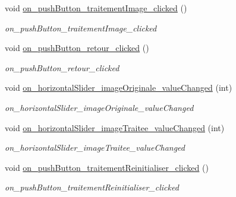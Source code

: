 \begin{DoxyCompactItemize}
\mbox{\label{classAppMainWindow_a094e49f72edd2a6b229f14aaff268baa}} 
void \hyperlink{classAppMainWindow_a094e49f72edd2a6b229f14aaff268baa}{on\+\_\+push\+Button\+\_\+traitement\+Image\+\_\+clicked} ()
\begin{DoxyCompactList}\small\item\em on\+\_\+push\+Button\+\_\+traitement\+Image\+\_\+clicked \end{DoxyCompactList}\item 
\mbox{\label{classAppMainWindow_ad88e547ca3b09758ee7695b936bcf8e9}} 
void \hyperlink{classAppMainWindow_ad88e547ca3b09758ee7695b936bcf8e9}{on\+\_\+push\+Button\+\_\+retour\+\_\+clicked} ()
\begin{DoxyCompactList}\small\item\em on\+\_\+push\+Button\+\_\+retour\+\_\+clicked \end{DoxyCompactList}\item 
\mbox{\label{classAppMainWindow_ab89de41267707db6ce2e05d81426ca52}} 
void \hyperlink{classAppMainWindow_ab89de41267707db6ce2e05d81426ca52}{on\+\_\+horizontal\+Slider\+\_\+image\+Originale\+\_\+value\+Changed} (int)
\begin{DoxyCompactList}\small\item\em on\+\_\+horizontal\+Slider\+\_\+image\+Originale\+\_\+value\+Changed \end{DoxyCompactList}\item 
\mbox{\label{classAppMainWindow_a93072ed048c9f2787297287aeabcbc5c}} 
void \hyperlink{classAppMainWindow_a93072ed048c9f2787297287aeabcbc5c}{on\+\_\+horizontal\+Slider\+\_\+image\+Traitee\+\_\+value\+Changed} (int)
\begin{DoxyCompactList}\small\item\em on\+\_\+horizontal\+Slider\+\_\+image\+Traitee\+\_\+value\+Changed \end{DoxyCompactList}\item 
\mbox{\label{classAppMainWindow_adff9d30acf6ab3f326244e854539f6c3}} 
void \hyperlink{classAppMainWindow_adff9d30acf6ab3f326244e854539f6c3}{on\+\_\+push\+Button\+\_\+traitement\+Reinitialiser\+\_\+clicked} ()
\begin{DoxyCompactList}\small\item\em on\+\_\+push\+Button\+\_\+traitement\+Reinitialiser\+\_\+clicked \end{DoxyCompactList}\item 

\end{DoxyCompactItemize}
